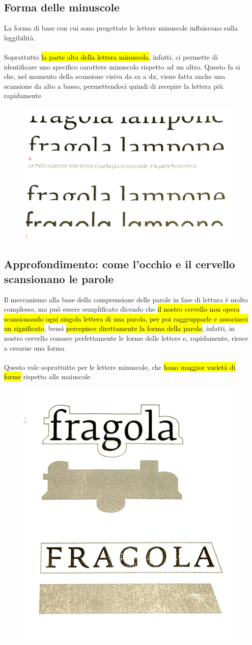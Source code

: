 \subsection{Forma delle minuscole}
La forma di base con cui sono progettate le lettere minuscole influiscono sulla leggibilità.
\\\\
Soprattutto \hl{ la parte alta della lettera minuscola}, infatti, ci permette di identificare uno specifico carattere minuscolo rispetto ad un altro.
Questo fa si che, nel momento della scansione visiva da sx a dx, viene fatta anche una scansione da alto a basso, permettendoci quindi di recepire la lettera più rapidamente
\begin{figure}[H]
    \centering
    \includegraphics[width=0.3\linewidth]{lzione_4/imgs/f5.jpg}
\end{figure}
\subsection{Approfondimento: come l'occhio e il cervello scansionano le parole}
Il meccanismo alla base della comprensione delle parole in fase di lettura è molto complesso, ma può essere semplificato dicendo che \hl{il nostro cervello non opera scansionando ogni singola lettera di una parola, per poi raggrupparle e associarci un significato}, bensì \hl{percepisce direttamente la forma della parola}; infatti, in nostro cervello conosce perfettamente le forme delle lettere e, rapidamente, riesce a crearne una forma
\\\\
Questo vale soprattutto per le lettere minuscole, che \hl{hano maggior varietà di forme} rispetto alle maiuscole
\begin{figure}[H]
    \centering
    \includegraphics[width=0.3\linewidth]{lzione_4/imgs/f6.jpg}
\end{figure}
